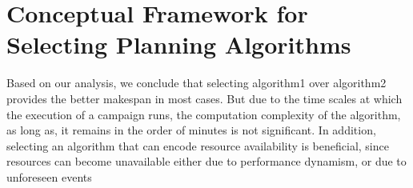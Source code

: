 %

\section{Conceptual Framework for Selecting Planning Algorithms}

Based on our analysis, we conclude that selecting algorithm1 over algorithm2 provides the better makespan in most cases. 
But due to the time scales at which the execution of a campaign runs, the computation complexity of the algorithm, as long as, it remains in the order of minutes is not significant.
In addition, selecting an algorithm that can encode resource availability is beneficial, since resources can become unavailable either due to performance dynamism, or due to unforeseen events
